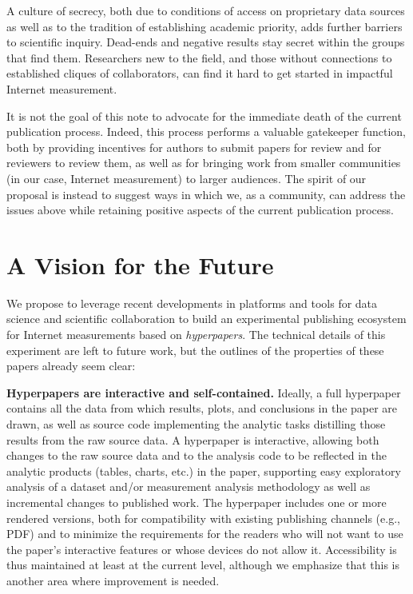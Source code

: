 \documentclass[sigconf,10pt]{acmart}
\begin{document}
A culture of secrecy, both due to conditions of access on proprietary data
sources as well as to the tradition of establishing academic priority, adds
further barriers to scientific inquiry. Dead-ends and negative results stay
secret within the groups that find them. Researchers new to the field, and those
without connections to established cliques of collaborators, can find it hard to
get started in impactful Internet measurement. 

It is not the goal of this note to advocate for the immediate death of the
current publication process. Indeed, this process performs a valuable gatekeeper
function, both by providing incentives for authors to submit papers for review
and for reviewers to review them, as well as for bringing work from smaller
communities (in our case, Internet measurement) to larger audiences. The spirit
of our proposal is instead to suggest ways in which we, as a community, can
address the issues above while retaining positive aspects of the current
publication process.

\section{A Vision for the Future}
\label{sec:vision}

We propose to leverage recent developments in platforms and tools for data
science and scientific collaboration to build an experimental publishing
ecosystem for Internet measurements based on {\em hyperpapers}. The technical
details of this experiment are left to future work, but the outlines of the
properties of these papers already seem clear:

\textbf{Hyperpapers are interactive and self-contained.} Ideally, a full
hyperpaper contains all the data from which results, plots, and conclusions in
the paper are drawn, as well as source code implementing the analytic tasks
distilling those results from the raw source data. A hyperpaper is interactive,
allowing both changes to the raw source data and to the analysis code to be
reflected in the analytic products (tables, charts, etc.) in the paper,
supporting easy exploratory analysis of a dataset and/or measurement analysis
methodology as well as incremental changes to published work. The hyperpaper
includes one or more rendered versions, both for compatibility with existing
publishing channels (e.g., PDF) and to minimize the requirements for the 
readers who will not want to use the paper's interactive features or whose
devices do not allow it. Accessibility is thus maintained at least at the
current level, although we emphasize that this is another area where improvement
is needed.
\end{document}

